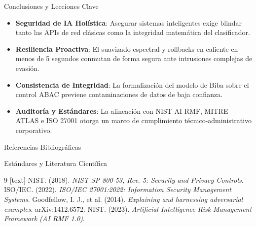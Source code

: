 \documentclass[10pt]{beamer}
\begin{document}
\begin{frame}{Conclusiones y Lecciones Clave}
  \begin{itemize}
    \item   \textbf{Seguridad de IA Holística}: Asegurar sistemas inteligentes exige blindar tanto las APIs de red clásicas como la integridad matemática del clasificador.
    \item   \textbf{Resiliencia Proactiva}: El suavizado espectral y rollbacks en caliente en menos de 5 segundos conmutan de forma segura ante intrusiones complejas de evasión.
    \item   \textbf{Consistencia de Integridad}: La formalización del modelo de Biba sobre el control ABAC previene contaminaciones de datos de baja confianza.
    \item   \textbf{Auditoría y Estándares}: La alineación con NIST AI RMF, MITRE ATLAS e ISO 27001 otorga un marco de cumplimiento técnico-administrativo corporativo.
  \end{itemize}
\end{frame}

\begin{frame}{Referencias Bibliográficas}
  \begin{block}{Estándares y Literatura Científica}
    \footnotesize
    \begin{thebibliography}{9}
      [text]
       NIST. (2018). \textit{NIST SP 800-53, Rev. 5: Security and Privacy Controls}.
       ISO/IEC. (2022). \textit{ISO/IEC 27001:2022: Information Security Management Systems}.
       Goodfellow, I. J., et al. (2014). \textit{Explaining and harnessing adversarial examples}. arXiv:1412.6572.
       NIST. (2023). \textit{Artificial Intelligence Risk Management Framework (AI RMF 1.0)}.
    \end{thebibliography}
  \end{block}
\end{frame}
\end{document}
